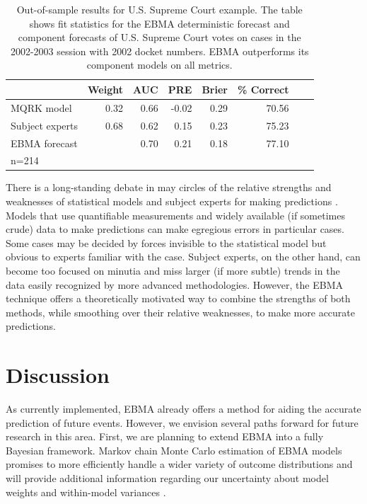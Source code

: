 \documentclass[12pt,fullpage]{article}
\begin{document}
\begin{table}[ht]
  \caption{\footnotesize Out-of-sample results for U.S. Supreme Court
    example.  The table shows fit statistics for the EBMA deterministic
    forecast and component forecasts of U.S. Supreme Court votes on
    cases in the 2002-2003 session with 2002 docket numbers.   EBMA
    outperforms its component models on all metrics. }
\label{SC-Res} \small
\begin{center}
\begin{tabular}{lrrrrrrr}
\toprule
 & Weight & AUC & PRE & Brier & \% Correct   \\ 
\midrule
MQRK model& 0.32  & 0.66 & -0.02 & 0.29 & 70.56   \\ 
Subject experts & 0.68 & 0.62 & 0.15 & 0.23 & 75.23  \\ 
EBMA forecast&  & 0.70 & 0.21 & 0.18 & 77.10  \\ 
\bottomrule
n=214 
\end{tabular}
\end{center}
\end{table}




There is a long-standing debate in may circles of the relative
strengths and weaknesses of statistical models and subject experts for
making predictions \citep[e.g.,][]{Ascher:1979}.  Models that use
quantifiable measurements and widely available (if sometimes crude)
data to make predictions can make egregious errors in particular
cases.  Some cases may be decided by forces invisible to the
statistical model but obvious to experts familiar with the case.
Subject experts, on the other hand, can become too focused on minutia
and miss larger (if more subtle) trends in the data easily recognized
by more advanced methodologies.  However, the EBMA technique offers a
theoretically motivated way to combine the strengths of both methods,
while smoothing over their relative weaknesses, to make more accurate
predictions.

\section{Discussion}

As currently implemented, EBMA already offers a method for aiding the
accurate prediction of future events.  However, we envision several
paths forward for future research in this area. First, we are planning
to extend EBMA into a fully Bayesian framework. Markov chain Monte
Carlo estimation of EBMA models promises to more efficiently handle a
wider variety of outcome distributions and will provide additional
information regarding our uncertainty about model weights and
within-model variances \citep{Vrugt:2008}.
\end{document}
